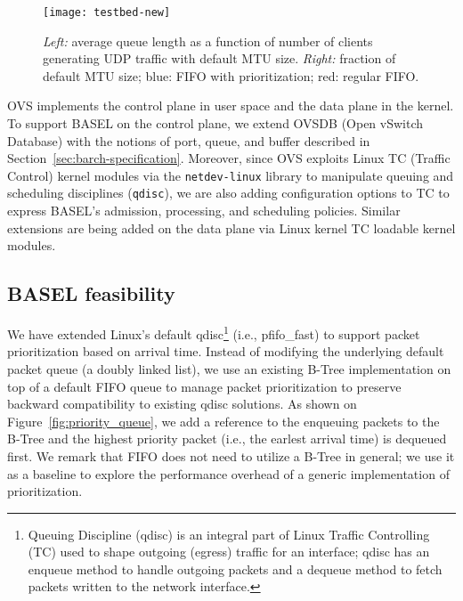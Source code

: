 \documentclass{article}
\newcommand{\barch}{BASEL}
\begin{document}
\begin{figure}[t]
\centering
\hspace{-2mm}
\texttt{[image: testbed-new]}
\caption{\emph{Left:} average queue length as a function of number of clients generating UDP traffic with default MTU size. \emph{Right:} fraction of default MTU size; blue: FIFO with prioritization; red: regular FIFO.}
\vspace{-6pt}
\label{fig:avg_queue_length}
\end{figure}




OVS implements the control plane in user space and the data plane in the kernel.
To support \barch{} on the control plane, we extend OVSDB (Open vSwitch Database) with the notions of port, queue, and buffer described in Section~\ref{sec:barch-specification}. Moreover, since OVS exploits Linux TC (Traffic Control) kernel modules via the \verb|netdev-linux| library to manipulate queuing and scheduling disciplines (\verb|qdisc|), we are also adding configuration options to TC to express \barch{}'s admission, processing, and scheduling policies.
Similar extensions are being added on the data plane via Linux kernel TC loadable kernel modules.
\subsection{\barch{} feasibility}
We have extended Linux's default qdisc\footnote{Queuing Discipline (qdisc) is an integral part of Linux Traffic Controlling (TC) used to shape outgoing (egress) traffic for an interface; qdisc has an enqueue method to handle outgoing packets and a dequeue method to fetch packets written to the network interface.} (i.e., pfifo\_fast) to support packet prioritization based on arrival time. Instead of modifying the underlying default packet queue (a doubly linked list), we use an existing B-Tree implementation on top of a default FIFO queue to manage packet prioritization to preserve backward compatibility to existing qdisc solutions. As shown on Figure~\ref{fig:priority_queue}, we add a reference to the enqueuing packets to the B-Tree and the highest priority packet (i.e., the earlest arrival time) is dequeued first. We remark that FIFO does not need to utilize a B-Tree in general; we use it as a baseline to explore the performance overhead of a generic implementation of prioritization. 
\end{document}
